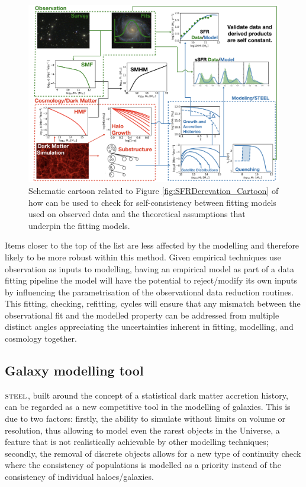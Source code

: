 \begin{figure}[t]
    \centering
    \includegraphics[width = \linewidth]{Figures/Chapter6/FullModelCartoon.png}
    \caption{Schematic cartoon related to Figure \ref{fig:SFRDerevation_Cartoon} of how \steel can be used to check for self-consistency between fitting models used on observed data and the theoretical assumptions that underpin the fitting models.}
    \label{fig:Full_Mod_Toon}
\end{figure}
Items closer to the top of the list are less affected by the modelling and therefore likely to be more robust within this method. Given empirical techniques use observation as inputs to modelling, having an empirical model as part of a data fitting pipeline the model will have the potential to reject/modify its own inputs by influencing the parametrisation of the observational data reduction routines. This fitting, checking, refitting, cycles will ensure that any mismatch between the observational fit and the modelled property can be addressed from multiple distinct angles appreciating the uncertainties inherent in fitting, modelling, and cosmology together.

\subsection{Galaxy modelling tool}

$\textsc{steel}$, built around the concept of a statistical dark matter accretion history, can be regarded as a new competitive tool in the modelling of galaxies. This is due to two factors: firstly, the ability to simulate without limits on volume or resolution, thus allowing to model even the rarest objects in the Universe, a feature that is not realistically achievable by other modelling techniques; secondly, the removal of discrete objects allows for a new type of continuity check where the consistency of populations is modelled as a priority instead of the consistency of individual haloes/galaxies. 

